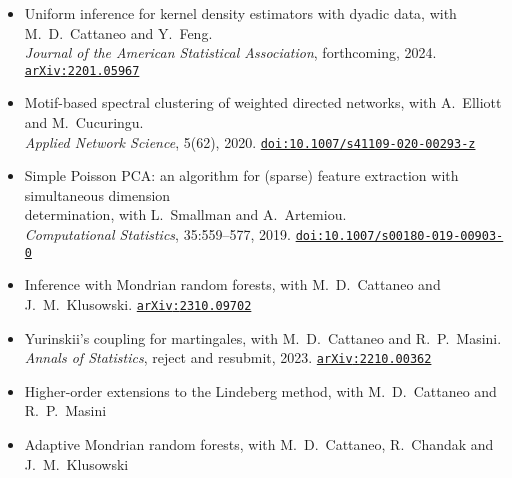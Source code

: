 \documentclass[
  date,
  number,
]{wgu-cv}
\begin{document}
\begin{itemize}

  \item Uniform inference for kernel density estimators with dyadic data,
    with M.\ D.\ Cattaneo and Y.\ Feng. \\
    \emph{Journal of the American Statistical Association}, forthcoming,
    2024.
    \href{https://arxiv.org/abs/2201.05967}{%
      \texttt{arXiv{:}{\allowbreak}2201.05967}}%

  \item Motif-based spectral clustering of weighted directed networks,
    with A.\ Elliott and M.\ Cucuringu. \\
    \emph{Applied Network Science}, 5(62), 2020.
    \href{https://doi.org/10.1007/s41109-020-00293-z}{%
      \texttt{doi:10.1007/s41109-020-00293-z}}%

  \item Simple Poisson PCA: an algorithm for (sparse) feature extraction
    with simultaneous dimension \\ determination,
    with L.\ Smallman and A.\ Artemiou. \\
    \emph{Computational Statistics}, 35:559--577, 2019.
    \href{https://doi.org/10.1007/s00180-019-00903-0}{%
      \texttt{doi:10.1007/s00180-019-00903-0}}%

\end{itemize}

\begin{itemize}

  \item Inference with Mondrian random forests,
    with M.\ D.\ Cattaneo and J.\ M.\ Klusowski.
    \href{https://arxiv.org/abs/2310.09702}{%
      \texttt{arXiv{:}{\allowbreak}2310.09702}}%

  \item Yurinskii's coupling for martingales,
    with M.\ D.\ Cattaneo and R.\ P.\ Masini. \\
    \emph{Annals of Statistics}, reject and resubmit, 2023.
    \href{https://arxiv.org/abs/2210.00362}{%
      \texttt{arXiv{:}{\allowbreak}2210.00362}}%

\end{itemize}

\begin{itemize}

  \item Higher-order extensions to the Lindeberg method,
    with M.\ D.\ Cattaneo and R.\ P.\ Masini

  \item Adaptive Mondrian random forests,
    with M.\ D.\ Cattaneo, R.\ Chandak and J.\ M.\ Klusowski
\end{itemize}
\end{document}
